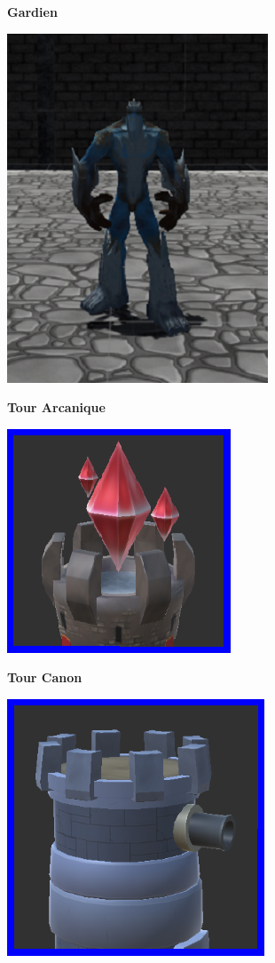 \documentclass[a4paper, 12pt]{article}
\begin{document}
\bigbreak
\large \textbf{Gardien}\\
\smallbreak
\centerline{\includegraphics[scale=0.8]{Overseer.png}}
\bigbreak

\large \textbf{Tour Arcanique}
\smallbreak
\centerline{\includegraphics{Mage.png}}
\bigbreak
\newpage
\large \textbf{Tour Canon}
\smallbreak
\centerline{\includegraphics{Canon.png}}
\bigbreak
\end{document}
